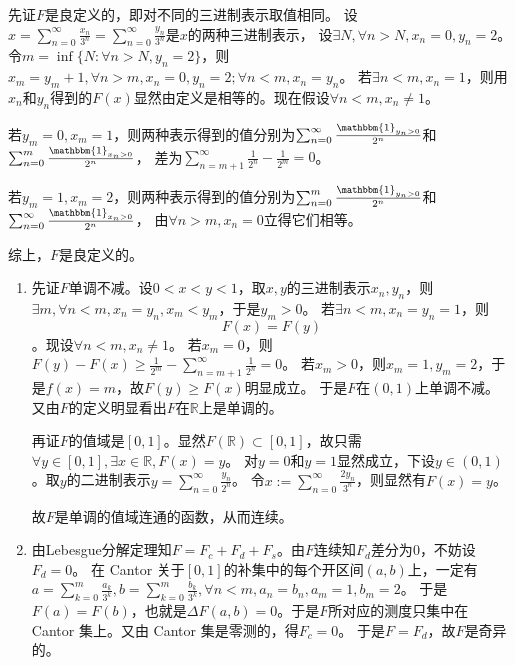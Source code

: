 \documentclass{ctexart}
\begin{document}
\begin{solution}
  先证\(F \)是良定义的，即对不同的三进制表示取值相同。
  设\(x = \sum_{n=0}^{\infty}\frac{x_n}{3^n} = \sum_{n=0}^{\infty}\frac{y_n}{3^n} \)是\(x \)的两种三进制表示，
  设\(\exists N,\forall n >N,x_n=0,y_n=2 \)。令\(m = \inf\{N:\forall n > N,y_n=2\} \)，则\(x_m=y_m+1,\forall n>m, x_n=0,y_n=2; \forall n<m,x_n=y_n  \)。
  若\(\exists n<m,x_n = 1 \)，则用\(x_n \)和\(y_n \)得到的\(F(x) \)显然由定义是相等的。现在假设\(\forall n<m,x_n \neq 1 \)。

  若\(y_m=0,x_m=1 \)，则两种表示得到的值分别为\(\sum_{n=0}^{\infty}\frac{\mathbbm{1}_{y_n>0}}{2^n} \)和\(\sum_{n=0}^{m}\frac{\mathbbm{1}_{x_n>0}}{2^n} \)，
  差为\(\sum_{n=m+1}^{\infty} \frac{1}{2^n}-\frac{1}{2^m}=0 \)。

  若\(y_m=1,x_m=2 \)，则两种表示得到的值分别为\(\sum_{n=0}^{m}\frac{\mathbbm{1}_{y_n>0}}{2^n} \)和\(\sum_{n=0}^{\infty}\frac{\mathbbm{1}_{x_n>0}}{2^n} \)，
  由\(\forall n>m,x_n=0 \)立得它们相等。

  综上，\(F \)是良定义的。
  \begin{enumerate}
    \item 先证\(F \)单调不减。设\(0<x<y<1 \)，取\(x,y \)的三进制表示\(x_n,y_n \)，则\(\exists m,\forall n<m,x_n=y_n, x_m<y_m \)，于是\(y_m>0 \)。
      若\(\exists n<m,x_n=y_n=1 \)，则\[F(x) = F(y) \]。现设\(\forall n<m,x_n \neq 1 \)。
      若\(x_m=0 \)，则\(F(y)-F(x) \geq \frac{1}{2^m}-\sum_{n=m+1}^{\infty} \frac{1}{2^n}=0 \)。
      若\(x_m >0 \)，则\(x_m=1,y_m=2 \)，于是\(f(x)=m \)，故\(F(y) \geq F(x) \)明显成立。
      于是\(F \)在\((0,1) \)上单调不减。又由\(F \)的定义明显看出\(F \)在\(\mathbb{R} \)上是单调的。

      再证\(F \)的值域是\([0,1] \)。显然\(F(\mathbb{R}) \subset [0,1] \)，故只需\(\forall y \in [0,1],\exists x \in \mathbb{R},F(x)=y \)。
      对\(y=0 \)和\(y=1 \)显然成立，下设\(y \in (0,1) \)。取\(y \)的二进制表示\(y = \sum_{n=0}^{\infty}\frac{y_n}{2^n} \)。
      令\(x:=\sum_{n=0}^{\infty}\frac{2y_n}{3^n} \)，则显然有\(F(x)=y \)。

      故\(F \)是单调的值域连通的函数，从而连续。
    \item 由Lebesgue分解定理知\(F=F_c+F_d+F_s \)。由\(F \)连续知\(F_d \)差分为\(0 \)，不妨设\(F_d=0 \)。
      在 Cantor 关于\([0,1] \)的补集中的每个开区间\((a,b) \)上，一定有\(a=\sum_{k=0}^{m} \frac{a_k}{3^k},b=\sum_{k = 0}^{m}\frac{b_k}{3^k},\forall n<m,a_n = b_n, a_m=1,b_m=2 \)。
      于是\(F(a)=F(b) \)，也就是\(\Delta F(a,b)=0 \)。于是\(F \)所对应的测度只集中在 Cantor 集上。又由 Cantor 集是零测的，得\(F_c=0 \)。
      于是\(F=F_d \)，故\(F \)是奇异的。
  \end{enumerate}
\end{solution}
\end{document}
